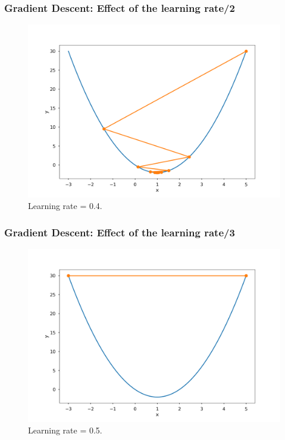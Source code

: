 \documentclass{beamer}
\begin{document}
	\begin{frame}
		\frametitle{Gradient Descent: Effect of the learning rate/2}
		\begin{figure}
			\centering
			\includegraphics[scale=0.3]{images/gradient_descent_2}
			\caption{Learning rate = 0.4.}
		\end{figure}
	\end{frame}

	\begin{frame}
		\frametitle{Gradient Descent: Effect of the learning rate/3}
		\begin{figure}
			\centering
			\includegraphics[scale=0.3]{images/gradient_descent_3}
			\caption{Learning rate = 0.5.}
		\end{figure}
	\end{frame}
\end{document}
